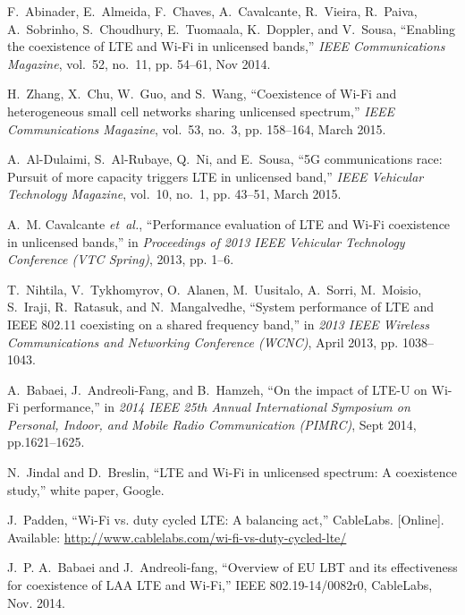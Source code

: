 
\begin{thebibliography}{99.}%
F.~Abinader, E.~Almeida, F.~Chaves, A.~Cavalcante, R.~Vieira, R.~Paiva, A.~Sobrinho, S.~Choudhury, E.~Tuomaala, K.~Doppler, and V.~Sousa, ``Enabling the coexistence of {LTE} and {Wi-Fi} in unlicensed bands,'' \emph{IEEE	Communications Magazine}, vol.~52, no.~11, pp. 54--61, Nov 2014.	
	
 H.~Zhang, X.~Chu, W.~Guo, and S.~Wang, ``Coexistence of {Wi-Fi} and heterogeneous small cell networks sharing unlicensed spectrum,'' \emph{IEEE	Communications Magazine}, vol.~53, no.~3, pp. 158--164, March 2015.

A.~Al-Dulaimi, S.~Al-Rubaye, Q.~Ni, and E.~Sousa, ``{5G} communications race: Pursuit of more capacity triggers {LTE} in unlicensed band,'' \emph{IEEE Vehicular Technology Magazine}, vol.~10, no.~1, pp. 43--51, March 2015.

A.~M. Cavalcante \emph{et~al.}, ``Performance evaluation of {LTE} and {Wi-Fi} coexistence in unlicensed bands,'' in \emph{Proceedings of 2013 IEEE	Vehicular Technology Conference (VTC Spring)}, 2013, pp. 1--6.

 T.~Nihtila, V.~Tykhomyrov, O.~Alanen, M.~Uusitalo, A.~Sorri, M.~Moisio, S.~Iraji, R.~Ratasuk, and N.~Mangalvedhe, ``System performance of {LTE} and
{IEEE} 802.11 coexisting on a shared frequency band,'' in \emph{2013 IEEE Wireless Communications and Networking Conference (WCNC)}, April 2013, pp. 1038--1043.

 A.~Babaei, J.~Andreoli-Fang, and B.~Hamzeh, ``On the impact of {LTE-U} on {Wi-Fi} performance,'' in \emph{2014 IEEE 25th Annual International Symposium	on Personal, Indoor, and Mobile Radio Communication (PIMRC)}, Sept 2014, pp.1621--1625.

 N.~Jindal and D.~Breslin, ``{LTE} and {Wi-Fi} in unlicensed spectrum: A coexistence study,'' white paper, Google.

 J.~Padden, ``{Wi-Fi} vs. duty cycled {LTE}: A balancing act,'' CableLabs. [Online]. Available: \url{http://www.cablelabs.com/wi-fi-vs-duty-cycled-lte/}

 J.~P. A.~Babaei and J.~Andreoli-fang, ``Overview of {EU} {LBT} and its effectiveness for coexistence of {LAA LTE} and {Wi-Fi},'' IEEE 802.19-14/0082r0, CableLabs, Nov. 2014.


\end{thebibliography}
